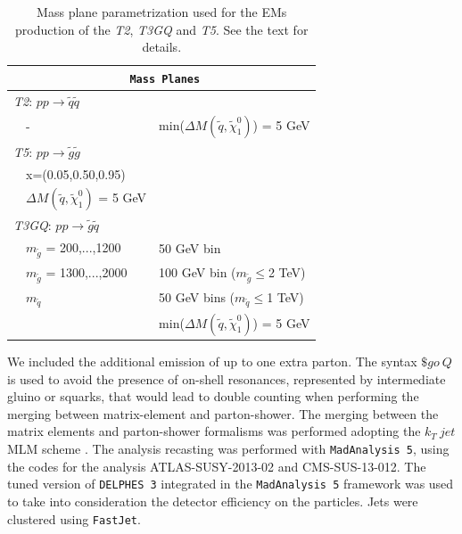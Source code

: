 \documentclass[a4paper,11pt]{article}
\newcommand{\TGQ}{ \textit{T3GQ}}
\newcommand{\Ttwo}{ \textit{T2}}
\newcommand{\Tfive}{ \textit{T5}}
\begin{document}
\begin{table}
	\label{mg5_processes}
	\footnotesize
	\small
	\renewcommand{\arraystretch}{1.0}
	\begin{tabular}{ l l l }  \toprule \toprule 
		\multicolumn{3}{c}{\texttt{ \normalsize \textbf{Mass Planes}}} \\ \toprule \toprule
		\multicolumn{3}{l}{\Ttwo: $p p \rightarrow \tilde q \tilde q$} \\
		& - & min($\Delta M(\tilde q, \tilde \chi _1 ^0)$) = 5 GeV \\ \midrule
		\multicolumn{3}{l}{\Tfive: $p p \rightarrow \tilde g \tilde g$} \\ 
		&x=(0.05,0.50,0.95) &  \\ 
		&$\Delta M(\tilde q, \tilde \chi _1 ^0)$ = 5 GeV&  \\ \midrule
		\multicolumn{3}{l}{\TGQ: $p p \rightarrow \tilde g \tilde q$} \\  
		& $m_{\tilde g}$ = 200,...,1200 & 50 GeV bin \\ 
		& $m_{\tilde g}$ = 1300,...,2000 & 100 GeV bin ($m_{\tilde g}\leq$2 TeV) \\
		& $m_{\tilde q}$ & 50 GeV bins ($m_{\tilde q}\leq$1 TeV) \\
		& & min($\Delta M(\tilde q, \tilde \chi _1 ^0)$) = 5 GeV \\ \bottomrule \bottomrule
	\end{tabular}
	\normalsize
	\caption{Mass plane parametrization used for the EMs production of the \textit{T2}, \textit{T3GQ} and \textit{T5}. See the text for details.}
	\label{TGQ_Planes} 
\end{table}
\fi
We included the additional emission of up to one extra parton. The syntax $\$go \ Q$ is used to avoid the presence of on-shell resonances, represented by intermediate gluino or squarks, that would lead to double counting when performing the merging between matrix-element and parton-shower. The merging between the matrix elements and parton-shower formalisms was performed adopting the $k_T \ jet$ MLM scheme \cite{MLM,Alwall:2007fs}. 
%
The analysis recasting was performed with \texttt{MadAnalysis 5}\cite{Conte:2012fm,Conte:2018vmg}, using the codes for the analysis ATLAS-SUSY-2013-02\cite{ATLAS-SUSY-2013-02MA5,ATLAS-SUSY-2013-02VALIDATION} and CMS-SUS-13-012\cite{CMS-SUS-13-012MA5,CMS-SUS-13-012VALIDATION}. The tuned version of \texttt{DELPHES 3} integrated in the \texttt{MadAnalysis 5} framework was used to take into consideration the detector efficiency on the particles. Jets were clustered using \texttt{FastJet}\cite{Cacciari:2011ma}. 
%
\\
\end{document}
